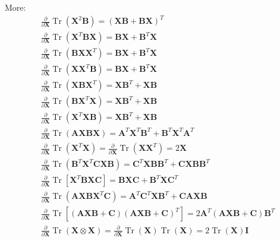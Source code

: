 \documentclass[oneside]{book}
\begin{document}
More:
\begin{align*}
& \frac{\partial}{\partial \mathbf{X}} \operatorname{Tr}\left(\mathbf{X}^2 \mathbf{B}\right)=(\mathbf{X B}+\mathbf{B X})^T \\
& \frac{\partial}{\partial \mathbf{X}} \operatorname{Tr}\left(\mathbf{X}^T \mathbf{B} \mathbf{X}\right)=\mathbf{B} \mathbf{X}+\mathbf{B}^T \mathbf{X} \\
& \frac{\partial}{\partial \mathbf{X}} \operatorname{Tr}\left(\mathbf{B} \mathbf{X} \mathbf{X}^T\right)=\mathbf{B} \mathbf{X}+\mathbf{B}^T \mathbf{X} \\
& \frac{\partial}{\partial \mathbf{X}} \operatorname{Tr}\left(\mathbf{X} \mathbf{X}^T \mathbf{B}\right)=\mathbf{B} \mathbf{X}+\mathbf{B}^T \mathbf{X} \\
& \frac{\partial}{\partial \mathbf{X}} \operatorname{Tr}\left(\mathbf{X B} \mathbf{X}^T\right)=\mathbf{X} \mathbf{B}^T+\mathbf{X B} \\
& \frac{\partial}{\partial \mathbf{X}} \operatorname{Tr}\left(\mathbf{B} \mathbf{X}^T \mathbf{X}\right)=\mathbf{X} \mathbf{B}^T+\mathbf{X B} \\
& \frac{\partial}{\partial \mathbf{X}} \operatorname{Tr}\left(\mathbf{X}^T \mathbf{X B}\right)=\mathbf{X} \mathbf{B}^T+\mathbf{X B} \\
& \frac{\partial}{\partial \mathbf{X}} \operatorname{Tr}(\mathbf{A X B X})=\mathbf{A}^T \mathbf{X}^T \mathbf{B}^T+\mathbf{B}^T \mathbf{X}^T \mathbf{A}^T \\
& \frac{\partial}{\partial \mathbf{X}} \operatorname{Tr}\left(\mathbf{X}^T \mathbf{X}\right)=\frac{\partial}{\partial \mathbf{X}} \operatorname{Tr}\left(\mathbf{X} \mathbf{X}^T\right)=2 \mathbf{X} \\
& \frac{\partial}{\partial \mathbf{X}} \operatorname{Tr}\left(\mathbf{B}^T \mathbf{X}^T \mathbf{C X B}\right)=\mathbf{C}^T \mathbf{X} \mathbf{B B}^T+\mathbf{C X B B}^T \\
& \frac{\partial}{\partial \mathbf{X}} \operatorname{Tr}\left[\mathbf{X}^T \mathbf{B X C}\right]=\mathbf{B X C}+\mathbf{B}^T \mathbf{X} \mathbf{C}^T \\
& \frac{\partial}{\partial \mathbf{X}} \operatorname{Tr}\left(\mathbf{A X B} \mathbf{X}^T \mathbf{C}\right)=\mathbf{A}^T \mathbf{C}^T \mathbf{X B}^T+\mathbf{C A X B} \\
& \frac{\partial}{\partial \mathbf{X}} \operatorname{Tr}\left[(\mathbf{A X B}+\mathbf{C})(\mathbf{A X B}+\mathbf{C})^T\right]=2 \mathbf{A}^T(\mathbf{A X B}+\mathbf{C}) \mathbf{B}^T \\
& \frac{\partial}{\partial \mathbf{X}} \operatorname{Tr}(\mathbf{X} \otimes \mathbf{X})=\frac{\partial}{\partial \mathbf{X}} \operatorname{Tr}(\mathbf{X}) \operatorname{Tr}(\mathbf{X})=2 \operatorname{Tr}(\mathbf{X}) \mathbf{I} \\
&
\end{align*}
\end{document}
